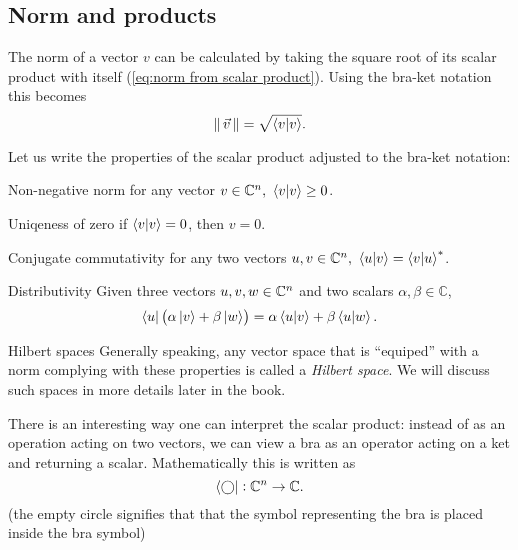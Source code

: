 \subsection{Norm and products}
The norm of a vector $v$ can be calculated by taking the square root of its scalar product with itself (\autoref{eq:norm from scalar product}). Using the bra-ket notation this becomes
\begin{equation}
	\norm{v} = \sqrt{\innerproduct{v}}.
	\label{eq:norm_braket}
\end{equation}

Let us write the properties of the scalar product adjusted to the bra-ket notation:
\begin{descitemize}
	\item[Non-negative norm] for any vector $v\in\Cs{n},\ \innerproduct{v}\geq0$.
	\item[Uniqeness of zero] if $\innerproduct{v}=0$, then $v=0$.
	\item[Conjugate commutativity] for any two vectors $u,v\in\Cs{n},\ \innerproduct{u}{v}=\sconj{\innerproduct{v}{u}}$.
	\item[Distributivity] Given three vectors $u,v,w\in\mathbb{C}^{n}$ and two scalars $\alpha,\beta\in\mathbb{C}$,
		\[
			\bra{u} \left( \alpha\ket{v}+\beta\ket{w} \right) = \alpha\innerproduct{u}{v} + \beta\innerproduct{u}{w}.
		\]
\end{descitemize}

\begin{note}{Hilbert spaces}
Generally speaking, any vector space that is ``equiped'' with a norm complying with these properties is called a \emph{Hilbert space}. We will discuss such spaces in more details later in the book.
\end{note}

There is an interesting way one can interpret the scalar product: instead of as an operation acting on two vectors, we can view a bra as an operator acting on a ket and returning a scalar. Mathematically this is written as
\begin{equation}
	\bra{\bigcirc}: \mathbb{C}^{n}\to\mathbb{C}.
	\label{eq:bra_as_operator}
\end{equation}
(the empty circle signifies that that the symbol representing the bra is placed inside the bra symbol)


